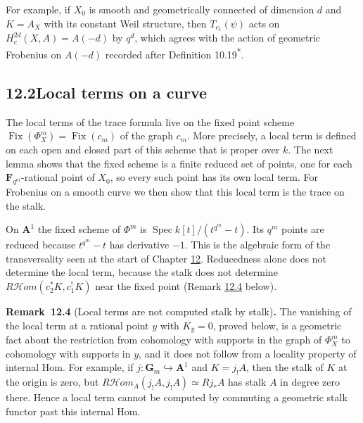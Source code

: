 \documentclass[11pt]{article}
\newenvironment{bpstatement}[2]{\par\addvspace{0.6\baselineskip}\noindent\textbf{#1}#2\textbf{.}\enspace\ignorespaces}
  {\par\addvspace{0.4\baselineskip}}
\newcommand{\bpout}[1]{#1\textsuperscript{\hyperlink{bp-outside}{\ensuremath{\ast}}}}
\providecommand{\Fix}{}\renewcommand{\Fix}{\operatorname{Fix}}
\providecommand{\cHom}{}\renewcommand{\cHom}{R\mathcal{H}\!om}
\begin{document}
\label{bp11}%
For example, if \(X_0\) is smooth and geometrically connected of dimension \(d\) and \(K=A_X\) with its constant Weil structure, then \(T_{c_1}(\psi)\) acts on \(H^{2d}_c(X,A)=A(-d)\) by \(q^d\), which agrees with the action of geometric Frobenius on \(A(-d)\) recorded after Definition \bpout{10.19}.


\subsection*{\texorpdfstring{12.2\quad Local terms on a curve}{12.2 Local terms on a curve}}
\label{bp12}%
\label{bp13}%
The local terms of the trace formula live on the fixed point scheme \(\Fix(\Phi_X^m)=\Fix(c_m)\) of the graph \(c_m\). More precisely, a local term is defined on each open and closed part of this scheme that is proper over \(k\). The next lemma shows that the fixed scheme is a finite reduced set of points, one for each \(\mathbf F_{q^m}\)-rational point of \(X_0\), so every such point has its own local term. For Frobenius on a smooth curve we then show that this local term is the trace on the stalk.

On \(\mathbf A^1\) the fixed scheme of \(\Phi^m\) is \(\operatorname{Spec}k[t]/(t^{q^m}-t)\). Its \(q^m\) points are reduced because \(t^{q^m}-t\) has derivative \(-1\). This is the algebraic form of the transversality seen at the start of Chapter \hyperref[bp1]{12}. Reducedness alone does not determine the local term, because the stalk does not determine \(\cHom(c_2^*K,c_1^!K)\) near the fixed point (Remark \hyperref[bp14]{12.4} below).

\label{bp14}%
\begin{bpstatement}{Remark~12.4}{ (Local terms are not computed stalk by stalk)}
The vanishing of the local term at a rational point \(y\) with \(K_{\bar y}=0\), proved below, is a geometric fact about the restriction from cohomology with supports in the graph of \(\Phi_X^m\) to cohomology with supports in \(y\), and it does not follow from a locality property of internal Hom. For example, if \(j:\mathbf G_m\hookrightarrow\mathbf A^1\) and \(K=j_!A\), then the stalk of \(K\) at the origin is zero, but \(\cHom_A(j_!A,j_!A)\simeq Rj_*A\) has stalk \(A\) in degree zero there. Hence a local term cannot be computed by commuting a geometric stalk functor past this internal Hom.
\end{bpstatement}
\end{document}
